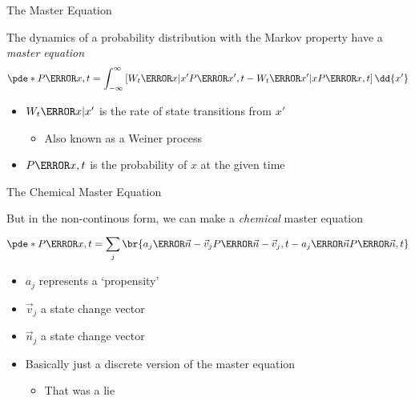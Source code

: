 \documentclass[aspectratio=169,  notheorems, sOuRcEs]{RUCPresentation}
\begin{document}
\begin{frame}{The Master Equation}


    The dynamics of a probability distribution with the Markov property
    have a \emph{master equation}
    \begin{equation} \label{eq.mastereq}
        \pde* P\of{x,t} =\int_{-\infty}^{\infty}
        \left[W_t\of{x|x'}P\of{x',t} - W_t\of{x'|x} P\of{x,t}\right]
        \dd{x'}
    \end{equation}
    \begin{itemize}
        \item  \(W_t\of{x|x'}\) is the rate of state transitions from \(x'\)
            \begin{itemize}
                \item Also known as a Weiner process
            \end{itemize}
        \item  \(P\of{x, t}\) is the probability of \(x\) at the given time
    \end{itemize}

\end{frame}

\begin{frame}{The Chemical Master Equation}


    \setcounter{footnote}{1}
    But in the non-continous form, we can make a \emph{chemical}
    master equation
    \begin{equation} \label{eq.chemmastereq}
        \pde* P\of{x,t}
        =
        \sum_{j}^{}\br{
            a_j\of{\vec{n} - \vec{v}_j} P\of{\vec{n} - \vec{v}_j,t}
            - a_j\of{\vec{n}} P\of{\vec{n},t}
        }
    \end{equation}

    \begin{itemize}
        \item \(a_j\) represents a `propensity'
        \item \(\vec{v}_j\) a state change vector
        \item \(\vec{n}_j\) a state change vector
        \item Basically just a discrete version of the master equation
            \begin{itemize}
                \item That was a lie
            \end{itemize}
    \end{itemize}

\end{frame}
\end{document}

